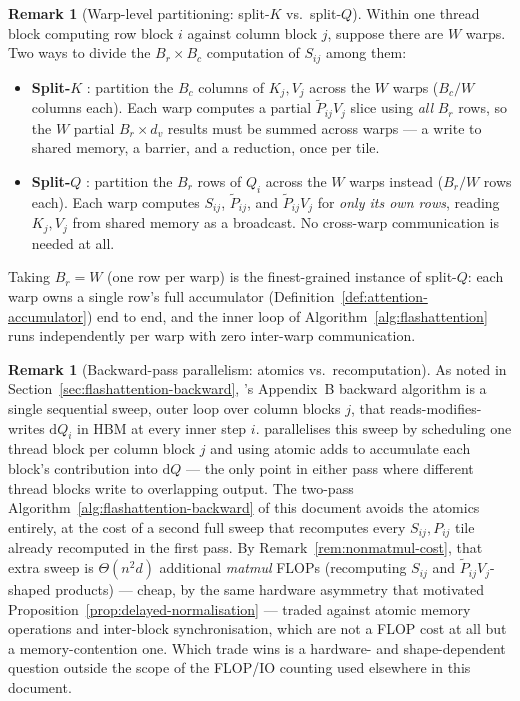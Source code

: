 \documentclass[11pt]{amsart}
\theoremstyle{plain}
\theoremstyle{definition}
\newtheorem{remark}[theorem]{Remark}
\begin{document}
\begin{remark}[Warp-level partitioning: split-$K$ vs.\ split-$Q$]
\label{rem:split-q}
Within one thread block computing row block $i$ against column block $j$,
suppose there are $W$ warps.  Two ways to divide the $B_r\times B_c$
computation of $S_{ij}$ among them:
\begin{itemize}
    \item \textbf{Split-$K$} \cite{Dao2022}: partition the $B_c$ columns of
    $K_j,V_j$ across the $W$ warps ($B_c/W$ columns each).  Each warp
    computes a partial $\tilde{P}_{ij}V_j$ slice using \emph{all} $B_r$
    rows, so the $W$ partial $B_r\times d_v$ results must be summed across
    warps --- a write to shared memory, a barrier, and a reduction, once
    per tile.
    \item \textbf{Split-$Q$} \cite{Dao2023}: partition the $B_r$ rows of
    $Q_i$ across the $W$ warps instead ($B_r/W$ rows each).  Each warp
    computes $S_{ij}$, $\tilde{P}_{ij}$, and $\tilde{P}_{ij}V_j$ for
    \emph{only its own rows}, reading $K_j,V_j$ from shared memory as a
    broadcast.  No cross-warp communication is needed at all.
\end{itemize}
Taking $B_r = W$ (one row per warp) is the finest-grained instance of
split-$Q$: each warp owns a single row's full accumulator
(Definition~\ref{def:attention-accumulator}) end to end, and the inner loop
of Algorithm~\ref{alg:flashattention} runs independently per warp with zero
inter-warp communication.
\end{remark}

\begin{remark}[Backward-pass parallelism: atomics vs.\ recomputation]
As noted in Section~\ref{sec:flashattention-backward}, \cite{Dao2022}'s
Appendix~B backward algorithm is a single sequential sweep, outer loop over
column blocks $j$, that reads-modifies-writes $\mathrm{d}Q_i$ in HBM at
every inner step $i$.  \cite{Dao2023} parallelises this sweep by
scheduling one thread block per column block $j$ and using atomic adds to
accumulate each block's contribution into $\mathrm{d}Q$ --- the only point
in either pass where different thread blocks write to overlapping output.
The two-pass Algorithm~\ref{alg:flashattention-backward} of this document
avoids the atomics entirely, at the cost of a second full sweep that
recomputes every $S_{ij}, P_{ij}$ tile already recomputed in the first
pass.  By Remark~\ref{rem:nonmatmul-cost}, that extra sweep is
$\Theta(n^2 d)$ additional \emph{matmul} FLOPs (recomputing $S_{ij}$ and
$\tilde{P}_{ij}V_j$-shaped products) --- cheap, by the same hardware
asymmetry that motivated Proposition~\ref{prop:delayed-normalisation} ---
traded against atomic memory operations and inter-block synchronisation,
which are not a FLOP cost at all but a memory-contention one.  Which
trade wins is a hardware- and shape-dependent question outside the scope of
the FLOP/IO counting used elsewhere in this document.
\end{remark}
\end{document}

